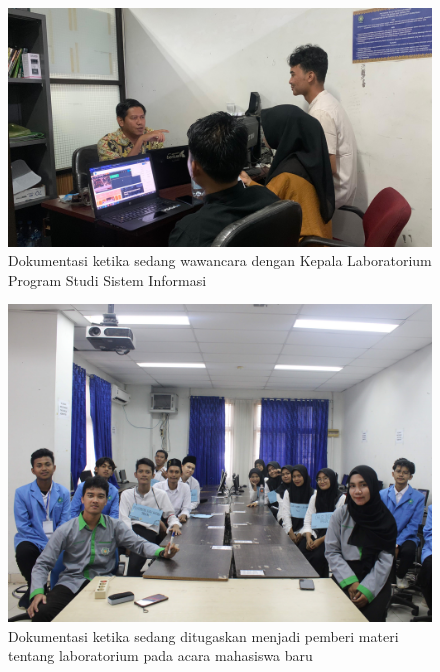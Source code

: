 \begin{figure}
	\centering
	\includegraphics[width=1\linewidth]{konten//gambar/Dokumentasi KP 3.jpg}
	\caption{Dokumentasi ketika sedang wawancara dengan Kepala Laboratorium Program Studi Sistem Informasi}
	\label{fig:enter-label}
\end{figure}
\begin{figure}
	\centering
	\includegraphics[width=1\linewidth]{konten//gambar/Dokumentasi KP 4.jpg}
	\caption{Dokumentasi ketika sedang ditugaskan menjadi pemberi materi tentang laboratorium pada acara mahasiswa baru}
	\label{fig:enter-label}
\end{figure}
